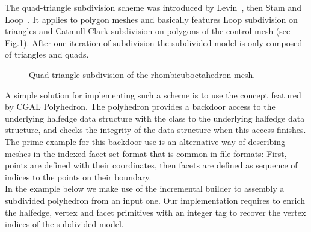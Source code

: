 
The quad-triangle subdivision scheme was introduced by
Levin~\cite{l-pg-03}, then Stam and Loop~\cite{qts}. It applies
to polygon meshes and basically features Loop subdivision on triangles
and Catmull-Clark subdivision on polygons of the control mesh (see
Fig.\ref{fig:quad-triangle}). After one iteration of subdivision the
subdivided model is only composed of triangles and quads. 



\begin{figure}[htb]
    \caption{Quad-triangle subdivision of the rhombicuboctahedron mesh.}
    \label{fig:quad-triangle}
\end{figure}

A simple solution for implementing such a scheme is to use the
 concept featured by CGAL 
Polyhedron. The polyhedron provides a backdoor access to the
underlying halfedge data structure with the 
class to the underlying halfedge data structure, and checks the
integrity of the data structure when this access finishes. The prime
example for this backdoor use is an alternative way of describing
meshes in the indexed-facet-set format that is common in file formats:
First, points are defined with their coordinates, then facets are
defined as sequence of indices to the points on their boundary.\\

In the example below we make use of the incremental builder to
assembly a subdivided polyhedron from an input one. Our implementation
requires to enrich the halfedge, vertex and facet primitives with an
integer tag to recover the vertex indices of the subdivided model.

